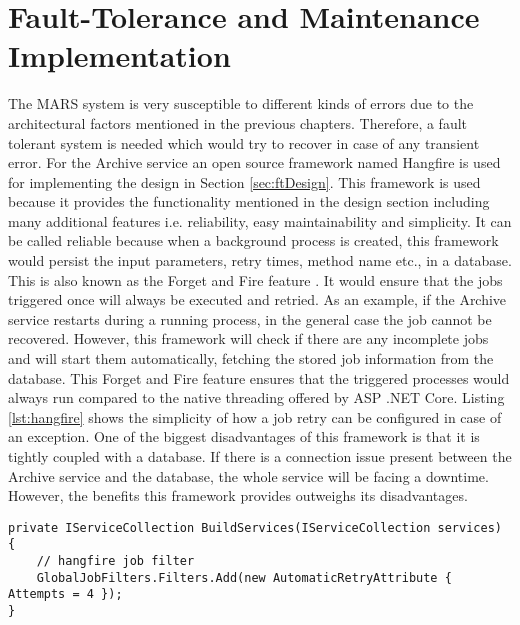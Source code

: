 \newpage
\section{Fault-Tolerance and Maintenance Implementation}
The MARS system is very susceptible to different kinds of errors due to the architectural factors mentioned in the previous chapters. Therefore, a fault tolerant
system is needed which would try to recover in case of any transient error. For the Archive service an open source framework
named Hangfire is used for implementing the design in Section \ref{sec:ftDesign}. This framework is used because it provides
the functionality mentioned in the design section including many additional features i.e. reliability, easy maintainability and simplicity. It can be called
reliable because when a background process is created, this framework would persist the input parameters, retry times, method name etc., in a database. 
This is also known as the Forget and Fire feature \cite{Hangfire}. It would
ensure that the jobs triggered once will always be executed and retried. As an example, if the
Archive service restarts during a running process, in the general case the job cannot be recovered. However, this framework will check if 
there are any incomplete jobs and will start them automatically, fetching the stored job information from the database. This Forget and Fire 
feature ensures that the triggered processes would always run compared to the native threading offered by ASP .NET Core.
Listing \ref{lst:hangfire}
shows the simplicity of how a job retry can be configured in case of an exception. One of the biggest disadvantages of this framework is that it is 
tightly coupled
with a database. If there is a connection issue present between the Archive service and the database, the whole service will be facing a downtime. However, the 
benefits this framework provides outweighs its disadvantages.

\begin{lstlisting}[language={[Sharp]C}, caption={Hangfire retry attempt configuration}, captionpos=b,label={lst:hangfire}]
private IServiceCollection BuildServices(IServiceCollection services)
{
    // hangfire job filter
    GlobalJobFilters.Filters.Add(new AutomaticRetryAttribute { Attempts = 4 });
}
\end{lstlisting}

